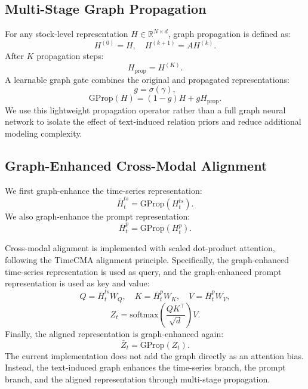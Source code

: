 \subsection{Multi-Stage Graph Propagation}

For any stock-level representation $H \in \mathbb{R}^{N \times d}$, graph propagation is defined as:
\begin{equation}
H^{(0)} = H, \quad H^{(k+1)} = A H^{(k)}.
\end{equation}
After $K$ propagation steps:
\begin{equation}
H_{\text{prop}} = H^{(K)}.
\end{equation}
A learnable graph gate combines the original and propagated representations:
\begin{equation}
g = \sigma(\gamma),
\end{equation}
\begin{equation}
\text{GProp}(H) = (1-g)H + gH_{\text{prop}}.
\end{equation}
We use this lightweight propagation operator rather than a full graph neural network to isolate the effect of text-induced relation priors and reduce additional modeling complexity.

\subsection{Graph-Enhanced Cross-Modal Alignment}

We first graph-enhance the time-series representation:
\begin{equation}
\bar{H}^{ts}_t = \text{GProp}(H^{ts}_t).
\end{equation}
We also graph-enhance the prompt representation:
\begin{equation}
\bar{H}^{p}_t = \text{GProp}(H^{p}_t).
\end{equation}

Cross-modal alignment is implemented with scaled dot-product attention, following the TimeCMA alignment principle. Specifically, the graph-enhanced time-series representation is used as query, and the graph-enhanced prompt representation is used as key and value:
\begin{equation}
Q = \bar{H}^{ts}_t W_Q, \quad
K = \bar{H}^{p}_t W_K, \quad
V = \bar{H}^{p}_t W_V,
\end{equation}
\begin{equation}
Z_t = \text{softmax}\left(\frac{QK^\top}{\sqrt{d}}\right)V.
\end{equation}
Finally, the aligned representation is graph-enhanced again:
\begin{equation}
\bar{Z}_t = \text{GProp}(Z_t).
\end{equation}
The current implementation does not add the graph directly as an attention bias. Instead, the text-induced graph enhances the time-series branch, the prompt branch, and the aligned representation through multi-stage propagation.

